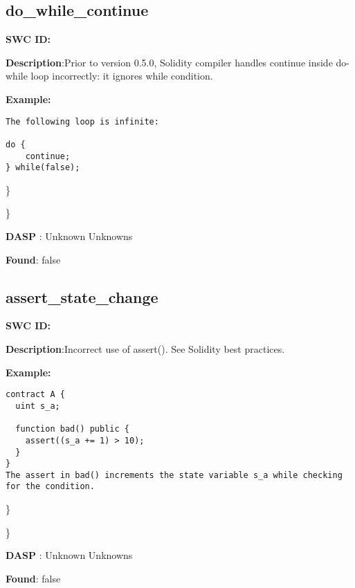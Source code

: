 \documentclass{article}
\begin{document}
\subsection{do\_while\_continue} 
\textbf{SWC \textunderscore ID:} 

\textbf{Description}:Prior to version 0.5.0, Solidity compiler handles continue inside do-while loop incorrectly: it ignores while condition.


\textbf{Example:} 
\begin{verbatim}
The following loop is infinite:

do {
    continue;
} while(false);

\end{verbatim}\} 

\} 

\textbf{DASP} : Unknown Unknowns

\textbf{Found}: false

\subsection{assert\_state\_change} 
\textbf{SWC \textunderscore ID:} 

\textbf{Description}:Incorrect use of assert(). See Solidity best practices.


\textbf{Example:} 
\begin{verbatim}
contract A {
  uint s_a;

  function bad() public {
    assert((s_a += 1) > 10);
  }
}
The assert in bad() increments the state variable s_a while checking for the condition.

\end{verbatim}\} 

\} 

\textbf{DASP} : Unknown Unknowns

\textbf{Found}: false
\end{document}
